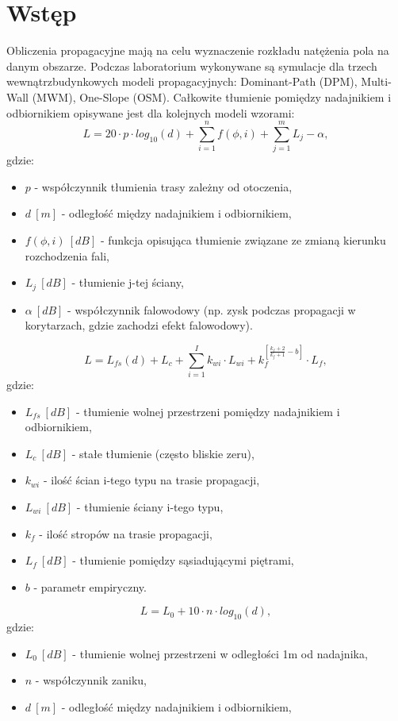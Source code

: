 \documentclass[12pt, a4paper, oneside]{article}
\begin{document}
\section{Wstęp}
\indent\indent Obliczenia propagacyjne mają na celu wyznaczenie rozkładu natężenia pola na danym obszarze. Podczas laboratorium wykonywane są symulacje dla trzech wewnątrzbudynkowych modeli propagacyjnych: Dominant-Path (DPM), Multi-Wall (MWM), One-Slope (OSM). Całkowite tłumienie pomiędzy nadajnikiem i odbiornikiem opisywane jest dla kolejnych modeli wzorami:
\begin{equation}
L=20\cdot p\cdot log_{10}(d)+\sum_{i=1}^nf(\phi,i)+\sum_{j=1}^mL_j-\alpha,
\end{equation}
gdzie:
\begin{itemize}
\item $p$ - współczynnik tłumienia trasy zależny od otoczenia,
\item $d~[m]$ - odległość między nadajnikiem i odbiornikiem,
\item $f(\phi,i)~[dB]$ - funkcja opisująca tłumienie związane ze zmianą kierunku rozchodzenia fali,
\item $L_j~[dB]$ - tłumienie j-tej ściany,
\item $\alpha~[dB]$ - współczynnik falowodowy (np. zysk podczas propagacji w korytarzach, gdzie zachodzi efekt falowodowy).
\end{itemize}
\begin{equation}
L=L_{fs}(d)+L_c+\sum_{i=1}^Ik_{wi}\cdot L_{wi}+k_f^{[\frac{k_f+2}{k_f+1}-b]}\cdot L_f,
\end{equation}
gdzie:
\begin{itemize}
\item $L_{fs}~[dB]$ - tłumienie wolnej przestrzeni pomiędzy nadajnikiem i odbiornikiem,
\item $L_c~[dB]$ - stałe tłumienie (często bliskie zeru),
\item $k_{wi}$ - ilość ścian i-tego typu na trasie propagacji,
\item $L_{wi}~[dB]$ - tłumienie ściany i-tego typu,
\item $k_f$ - ilość stropów na trasie propagacji,
\item $L_f~[dB]$ - tłumienie pomiędzy sąsiadującymi piętrami,
\item $b$ - parametr empiryczny.
\end{itemize}
\begin{equation}
L=L_0+10\cdot n\cdot log_{10}(d),
\end{equation}
gdzie:
\begin{itemize}
\item $L_0~[dB]$ - tłumienie wolnej przestrzeni w odległości 1m od nadajnika,
\item $n$ - współczynnik zaniku,
\item $d~[m]$ - odległość między nadajnikiem i odbiornikiem,
\end{itemize}
\end{document}
